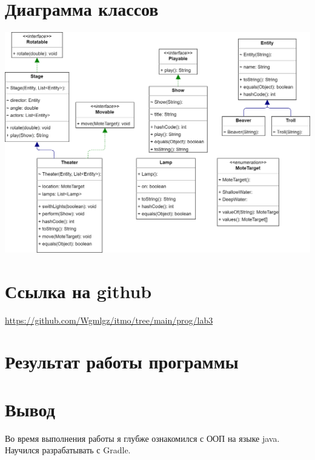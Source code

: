 \documentclass{article}
\begin{document}
\section{Диаграмма классов}

\begin{center}
  \includegraphics[scale=0.2]{diagram.png}
\end{center}

\section{Ссылка на github}
\url{https://github.com/Wgmlgz/itmo/tree/main/prog/lab3}
\section{Результат работы программы}
\section{Вывод}
Во время выполнения работы я глубже ознакомился с ООП на языке java. Научился разрабатывать с Gradle.
\end{document}
